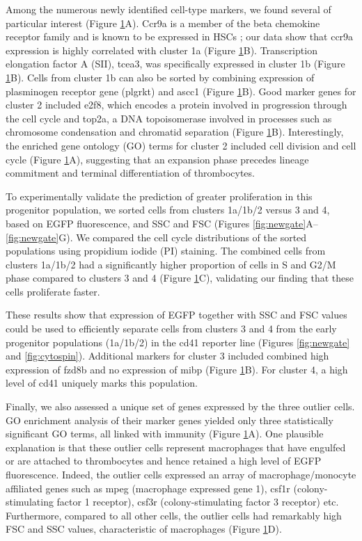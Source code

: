 \begin{figure}
    \label{fig:clusters}
\end{figure}

Among the numerous newly identified cell-type markers, we found several of particular interest (Figure \ref{fig:clusters}A). Ccr9a is a member of the beta chemokine receptor family and is known to be expressed in HSCs \cite{Wright2002-xi}; our data show that ccr9a expression is highly correlated with cluster 1a (Figure \ref{fig:clusters}B). Transcription elongation factor A (SII), tcea3, was specifically expressed in cluster 1b (Figure \ref{fig:clusters}B). Cells from cluster 1b can also be sorted by combining expression of plasminogen receptor gene (plgrkt) and ascc1 (Figure \ref{fig:clusters}B). Good marker genes for cluster 2 included e2f8, which encodes a protein involved in progression through the cell cycle \cite{Deng2010-am} and top2a, a DNA topoisomerase involved in processes such as chromosome condensation and chromatid separation  \cite{Downes1994-sl} (Figure \ref{fig:clusters}B). Interestingly, the enriched gene ontology (GO) terms for cluster 2 included cell division and cell cycle (Figure \ref{fig:clusters}A), suggesting that an expansion phase precedes lineage commitment and terminal differentiation of thrombocytes.

To experimentally validate the prediction of greater proliferation in this progenitor population, we sorted cells from clusters 1a/1b/2 versus 3 and 4, based on EGFP fluorescence, and SSC and FSC (Figures \ref{fig:newgate}A–\ref{fig:newgate}G). We compared the cell cycle distributions of the sorted populations using propidium iodide (PI) staining. The combined cells from clusters 1a/1b/2 had a significantly higher proportion of cells in S and G2/M phase compared to clusters 3 and 4 (Figure \ref{fig:clusters}C), validating our finding that these cells proliferate faster.

These results show that expression of EGFP together with SSC and FSC values could be used to efficiently separate cells from clusters 3 and 4 from the early progenitor populations (1a/1b/2) in the cd41 reporter line (Figures \ref{fig:newgate} and \ref{fig:cytospin}). Additional markers for cluster 3 included combined high expression of fzd8b and no expression of mibp (Figure \ref{fig:clusters}B). For cluster 4, a high level of cd41 uniquely marks this population.

Finally, we also assessed a unique set of genes expressed by the three outlier cells. GO enrichment analysis of their marker genes yielded only three statistically significant GO terms, all linked with immunity (Figure \ref{fig:clusters}A). One plausible explanation is that these outlier cells represent macrophages that have engulfed or are attached to thrombocytes and hence retained a high level of EGFP fluorescence. Indeed, the outlier cells expressed an array of macrophage/monocyte affiliated genes such as mpeg (macrophage expressed gene 1), csf1r (colony-stimulating factor 1 receptor), csf3r (colony-stimulating factor 3 receptor) etc. Furthermore, compared to all other cells, the outlier cells had remarkably high FSC and SSC values, characteristic of macrophages (Figure \ref{fig:clusters}D).

